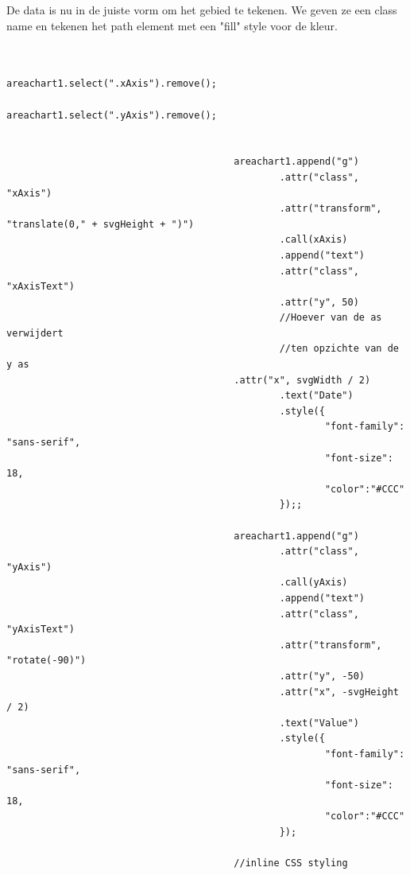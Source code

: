 De data is nu in de juiste vorm om het gebied te tekenen. We geven ze een class name en tekenen het path element met een "fill" style voor de kleur.

\begin{lstlisting}[gobble=24]

                                        areachart1.select(".xAxis").remove();
                                        areachart1.select(".yAxis").remove();


                                        areachart1.append("g")
                                                .attr("class", "xAxis")
                                                .attr("transform", "translate(0," + svgHeight + ")")
                                                .call(xAxis)
                                                .append("text")
                                                .attr("class", "xAxisText")
                                                .attr("y", 50) 
                                                //Hoever van de as verwijdert
                                                //ten opzichte van de y as
                                        .attr("x", svgWidth / 2)
                                                .text("Date")
                                                .style({
                                                        "font-family": "sans-serif",
                                                        "font-size": 18,
														"color":"#CCC"
                                                });;

                                        areachart1.append("g")
                                                .attr("class", "yAxis")
                                                .call(yAxis)
                                                .append("text")
                                                .attr("class", "yAxisText")
                                                .attr("transform", "rotate(-90)")
                                                .attr("y", -50)
                                                .attr("x", -svgHeight / 2)
                                                .text("Value")
                                                .style({
                                                        "font-family": "sans-serif",
                                                        "font-size": 18,
														"color":"#CCC"
                                                });

                                        //inline CSS styling


\end{lstlisting}
